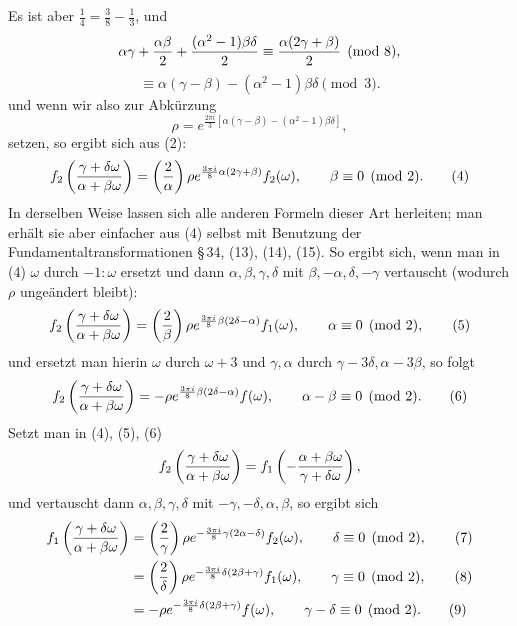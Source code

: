 \documentclass[11pt]{article}
\newcommand{\Jac}[2]{\left(\frac{#1}{#2}\right)}
\begin{document}
Es ist aber $\frac14=\frac38-\frac13$, und
\[
\alpha\gamma+{\alpha\beta\over2}+{(\alpha^2-1)\beta\delta\over2}
\equiv {\alpha(2\gamma+
\beta)\over2}\pmod 8,
\]
\[
\equiv \alpha(\gamma-\beta)-(\alpha^2-1)\beta\delta\pmod 3.
\]
und wenn wir also zur Abkürzung
\begin{equation}
\rho=e^{\frac{2\pi i}{3}[\alpha(\gamma-\beta)-(\alpha^2-1)\beta\delta]},
\tag{3}
\end{equation}
setzen, so ergibt sich aus (2):
\begin{equation}
f_2\left({\gamma+
\delta\omega\over\alpha+
\beta\omega}\right)
=\Jac{2}{\alpha}\rho e^{\frac{3\pi i}{8}\alpha(2\gamma+
\beta)}f_2(\omega),
\qquad \beta\equiv0\pmod2. 
\tag{4}
\end{equation}
In derselben Weise lassen sich alle anderen Formeln dieser Art herleiten; man erhält sie aber einfacher aus (4) selbst mit Benutzung der Fundamentaltransformationen \S\,34, (13), (14), (15). So ergibt sich, wenn man in (4) $\omega$ durch $-1:\omega$ ersetzt und dann $\alpha,\beta,\gamma,\delta$ mit $\beta,-\alpha,\delta,-\gamma$ vertauscht (wodurch $\rho$ ungeändert bleibt):
\begin{equation}
f_2\left({\gamma+
\delta\omega\over\alpha+
\beta\omega}\right)
=\Jac{2}{\beta}\rho e^{\frac{3\pi i}{8}\beta(2\delta-
\alpha)}f_1(\omega),
\qquad \alpha\equiv0\pmod2,
\tag{5}
\end{equation}
und ersetzt man hierin $\omega$ durch $\omega+3$ und $\gamma,
\alpha$ durch $\gamma-3\delta,
\alpha-3\beta$, so folgt
\begin{equation}
f_2\left({\gamma+
\delta\omega\over\alpha+
\beta\omega}\right)
=-\rho e^{\frac{3\pi i}{8}\beta(2\delta-
\alpha)}f(\omega),
\qquad \alpha-
\beta\equiv0\pmod2. 
\tag{6}
\end{equation}
Setzt man in (4), (5), (6)
\[
f_2\left({\gamma+
\delta\omega\over\alpha+
\beta\omega}\right)
=f_1\left(-{\alpha+
\beta\omega\over\gamma+
\delta\omega}\right),
\]
und vertauscht dann $\alpha,\beta,\gamma,\delta$ mit $-\gamma,-\delta,\alpha,\beta$, so ergibt sich
\begin{align}
f_1\left({\gamma+
\delta\omega\over\alpha+
\beta\omega}\right)
&=\Jac{2}{\gamma}\rho e^{-\frac{3\pi i}{8}\gamma(2\alpha-
\delta)}f_2(\omega),
\qquad \delta\equiv0\pmod2, \tag{7}\\
&=\Jac{2}{\delta}\rho e^{-\frac{3\pi i}{8}\delta(2\beta+
\gamma)}f_1(\omega),
\qquad \gamma\equiv0\pmod2, \tag{8}\\
&=-\rho e^{-\frac{3\pi i}{8}\delta(2\beta+
\gamma)}f(\omega),
\qquad \gamma-
\delta\equiv0\pmod2. \tag{9}
\end{align}
\end{document}
